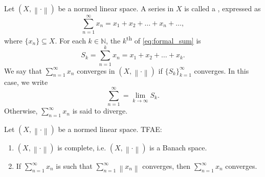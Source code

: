 \documentclass[notoc,notitlepage]{tufte-book}
\newcommand{\norm}[1]{\left\| #1 \right\|}
\begin{document}
\begin{defn}\label{defn:formal_sum}
  Let $(X, \norm\cdot)$ be a normed linear space. A series in $X$ is called a , expressed as
  \begin{equation}\label{eq:formal_sum}
    \sum_{n=1}^{\infty} x_n = x_1 + x_2 + \hdots + x_n + \hdots ,
  \end{equation}
  where $\{ x_n \} \subseteq X$. For each $k \in \mathbb{N}$, the $k$\textsuperscript{th}  of \cref{eq:formal_sum} is
  \begin{equation*}
    S_k = \sum_{n=1}^{k} x_n = x_1 + x_2 + \hdots + x_k.
  \end{equation*}
  We say that $\sum_{n=1}^{\infty} x_n$ converges in $(X, \norm\cdot)$ if $\{ S_k \}_{k = 1}^{\infty}$ converges. In this case, we write
  \begin{equation*}
    \sum_{n=1}^{\infty} = \lim_{k \to \infty} S_k.
  \end{equation*}
  Otherwise, $\sum_{n=1}^{\infty} x_n$ is said to diverge.
\end{defn}

\begin{thm}\label{thm:weierstrass_m_test}
  Let $(X, \norm\cdot)$ be a normed linear space. TFAE:
  \begin{enumerate}
    \item $(X, \norm\cdot)$ is complete, i.e. $(X, \norm\cdot)$ is a Banach space.
    \item If $\sum_{n=1}^{\infty} x_n$ is such that $\sum_{n=1}^{\infty} \norm{x_n}$ converges, then $\sum_{n=1}^{\infty} x_n$ converges.
  \end{enumerate}
\end{thm}
\end{document}
